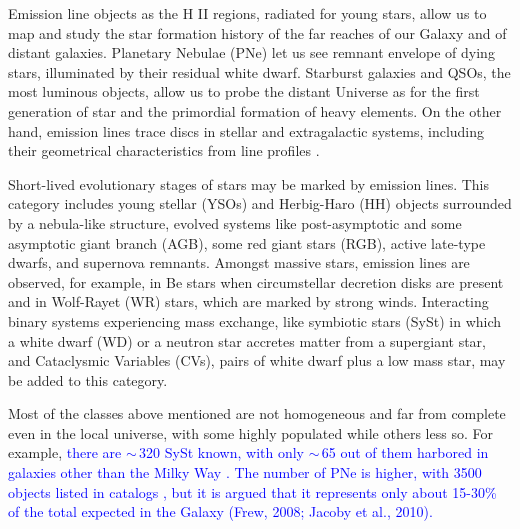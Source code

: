 \documentclass[fleqn,usenatbib]{mnras}
\newcommand{\rlopes}[1]{\textcolor{blue}{#1}}
\begin{document}
Emission line objects as the H II regions, radiated for young stars, allow us to map and study the star formation history
of the far reaches of our Galaxy and of distant galaxies. 
Planetary Nebulae (PNe) let us see remnant envelope of dying stars, illuminated by their residual white dwarf. 
Starburst galaxies and QSOs, the most luminous objects, allow us to probe the distant Universe
as for the first generation of star and the primordial formation of heavy elements. 
On the other hand, emission lines 
 trace  discs \citep{Schwope:2000, Ratti:2012} in stellar and extragalactic systems, including their geometrical characteristics from line profiles \citep{Horne:1986}.

Short-lived evolutionary stages of stars may be marked by emission lines. This category includes young stellar (YSOs) and Herbig-Haro (HH) objects surrounded by a 
nebula-like structure, evolved systems like 
post-asymptotic and some asymptotic giant branch (AGB), some
red giant stars (RGB), active late-type dwarfs, and supernova remnants. 
Amongst massive stars, emission lines are observed, for example, in Be stars when 
circumstellar decretion disks are present and in Wolf-Rayet (WR) stars, which are marked by strong winds.  
Interacting binary systems experiencing mass exchange, 
like symbiotic stars (SySt) in which a white dwarf (WD) or a neutron star accretes matter from a supergiant star, and Cataclysmic Variables (CVs), pairs of  white dwarf plus a low mass star, may be added to this category. 

Most of the classes above mentioned are not homogeneous 
and far from complete even in the local universe, with some highly populated while others less so. For example, 
\rlopes{there are $\sim$\,320 SySt known, with only $\sim$\,65 out of them harbored in galaxies other than the Milky Way \citep{Akras:2019a}.}
\rlopes{The number of PNe is higher, with 3500 objects listed in catalogs \citep{Parker:2016}, but it is argued that it represents only about 15-30\% of the total expected in the Galaxy (Frew, 2008; Jacoby et al., 2010).}
\end{document}
